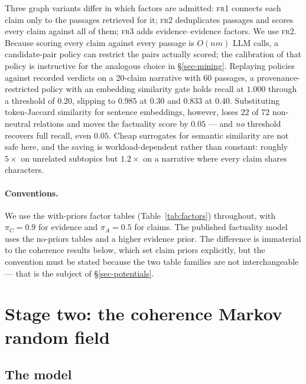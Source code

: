 Three graph variants differ in which factors are admitted: \textsc{fr1} connects each claim only
to the passages retrieved for it; \textsc{fr2} deduplicates passages and scores every claim
against all of them; \textsc{fr3} adds evidence--evidence factors. We use \textsc{fr2}. Because
scoring every claim against every passage is $O(nm)$ LLM calls, a candidate-pair policy can restrict
the pairs actually scored; the calibration of that policy is instructive for the analogous choice
in \S\ref{sec-mining}. Replaying policies against recorded verdicts on a 20-claim narrative with 60
passages, a provenance-restricted policy with an embedding similarity gate holds recall at $1.000$
through a threshold of $0.20$, slipping to $0.985$ at $0.30$ and $0.833$ at $0.40$. Substituting
token-Jaccard similarity for sentence embeddings, however, loses $22$ of $72$ non-neutral relations
and moves the factuality score by $0.05$ --- and \emph{no} threshold recovers full recall, even
$0.05$. Cheap surrogates for semantic similarity are not safe here, and the saving is
workload-dependent rather than constant: roughly $5\times$ on unrelated subtopics but $1.2\times$
on a narrative where every claim shares characters.

\paragraph{Conventions.} We use the with-priors factor tables (Table~\ref{tab:factors}) throughout,
with $\pi_C=0.9$ for evidence and $\pi_A=0.5$ for claims. The published factuality model uses the
no-priors tables and a higher evidence prior. The difference is immaterial to the coherence results
below, which set claim priors explicitly, but the convention must be stated because the two table
families are not interchangeable --- that is the subject of \S\ref{sec-potentials}.

\section{Stage two: the coherence Markov random field}
\label{sec-coherence}

\subsection{The model}
\label{sec-model}


